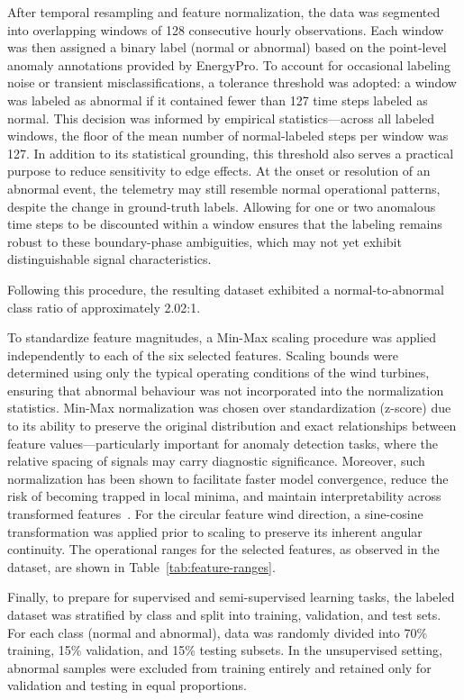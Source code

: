 After temporal resampling and feature normalization, the data was segmented into overlapping windows of 128 consecutive hourly observations.
Each window was then assigned a binary label (normal or abnormal) based on the point-level anomaly annotations provided by EnergyPro.
To account for occasional labeling noise or transient misclassifications, a tolerance threshold was adopted: a window was labeled as abnormal if it contained fewer than 127 time steps labeled as normal.
This decision was informed by empirical statistics—across all labeled windows, the floor of the mean number of normal-labeled steps per window was 127.
In addition to its statistical grounding, this threshold also serves a practical purpose to reduce sensitivity to edge effects.
At the onset or resolution of an abnormal event, the telemetry may still resemble normal operational patterns, despite the change in ground-truth labels.
Allowing for one or two anomalous time steps to be discounted within a window ensures that the labeling remains robust to these boundary-phase ambiguities, which may not yet exhibit distinguishable signal characteristics.

Following this procedure, the resulting dataset exhibited a normal-to-abnormal class ratio of approximately 2.02:1.

To standardize feature magnitudes, a Min-Max scaling procedure was applied independently to each of the six selected features. 
Scaling bounds were determined using only the typical operating conditions of the wind turbines, ensuring that abnormal behaviour was not incorporated into the normalization statistics.
Min-Max normalization was chosen over standardization (z-score) due to its ability to preserve the original distribution and exact relationships between feature values—particularly important for anomaly detection tasks, where the relative spacing of signals may carry diagnostic significance.
Moreover, such normalization has been shown to facilitate faster model convergence, reduce the risk of becoming trapped in local minima, and maintain interpretability across transformed features~\citep{fan_analytical_2018}.
For the circular feature wind direction, a sine-cosine transformation was applied prior to scaling to preserve its inherent angular continuity.
The operational ranges for the selected features, as observed in the dataset, are shown in Table~\ref{tab:feature-ranges}.

Finally, to prepare for supervised and semi-supervised learning tasks, the labeled dataset was stratified by class and split into training, validation, and test sets.
For each class (normal and abnormal), data was randomly divided into 70\% training, 15\% validation, and 15\% testing subsets.
In the unsupervised setting, abnormal samples were excluded from training entirely and retained only for validation and testing in equal proportions.



